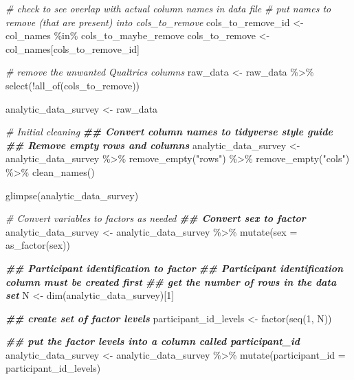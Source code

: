 \documentclass[
]{krantz}
\makeatletter
\newenvironment{Shaded}{\begin{snugshade}}{\end{snugshade}}
\newcommand{\AttributeTok}[1]{\textcolor[rgb]{0.61,0.61,0.61}{#1}}
\newcommand{\CommentTok}[1]{\textcolor[rgb]{0.37,0.37,0.37}{\textit{#1}}}
\newcommand{\DecValTok}[1]{\textcolor[rgb]{0.06,0.06,0.06}{#1}}
\newcommand{\DocumentationTok}[1]{\textcolor[rgb]{0.37,0.37,0.37}{\textbf{\textit{#1}}}}
\newcommand{\FunctionTok}[1]{\textcolor[rgb]{0,0,0}{#1}}
\newcommand{\NormalTok}[1]{#1}
\newcommand{\OtherTok}[1]{\textcolor[rgb]{0.37,0.37,0.37}{#1}}
\newcommand{\SpecialCharTok}[1]{\textcolor[rgb]{0,0,0}{#1}}
\newcommand{\StringTok}[1]{\textcolor[rgb]{0.5,0.5,0.5}{#1}}
\newenvironment{kframe}{%
\medskip{}
\setlength{\fboxsep}{.8em}
 \def\at@end@of@kframe{}%
 \ifinner\ifhmode%
  \def\at@end@of@kframe{\end{minipage}}%
  \begin{minipage}{\columnwidth}%
 \fi\fi%
 \def\FrameCommand##1{\hskip\@totalleftmargin \hskip-\fboxsep
 \colorbox{shadecolor}{##1}\hskip-\fboxsep
     \hskip-\linewidth \hskip-\@totalleftmargin \hskip\columnwidth}%
 \MakeFramed {\advance\hsize-\width
   \@totalleftmargin\z@ \linewidth\hsize
   \@setminipage}}%
 {\par\unskip\endMakeFramed%
 \at@end@of@kframe}
\renewenvironment{Shaded}{\begin{kframe}}{\end{kframe}}
\makeatother
\begin{document}
\begin{Shaded}
\begin{Highlighting}[]
\CommentTok{\# check to see overlap with actual column names in data file}
\CommentTok{\# put names to remove (that are present) into cols\_to\_remove}
\NormalTok{cols\_to\_remove\_id }\OtherTok{\textless{}{-}}\NormalTok{ col\_names }\SpecialCharTok{\%in\%}\NormalTok{ cols\_to\_maybe\_remove}
\NormalTok{cols\_to\_remove }\OtherTok{\textless{}{-}}\NormalTok{ col\_names[cols\_to\_remove\_id]}

\CommentTok{\# remove the unwanted Qualtrics columns}
\NormalTok{raw\_data }\OtherTok{\textless{}{-}}\NormalTok{ raw\_data }\SpecialCharTok{\%\textgreater{}\%} 
  \FunctionTok{select}\NormalTok{(}\SpecialCharTok{!}\FunctionTok{all\_of}\NormalTok{(cols\_to\_remove))}


\NormalTok{analytic\_data\_survey }\OtherTok{\textless{}{-}}\NormalTok{ raw\_data}

\CommentTok{\# Initial cleaning}
\DocumentationTok{\#\# Convert column names to tidyverse style guide}
\DocumentationTok{\#\# Remove empty rows and columns}
\NormalTok{analytic\_data\_survey }\OtherTok{\textless{}{-}}\NormalTok{ analytic\_data\_survey }\SpecialCharTok{\%\textgreater{}\%}
  \FunctionTok{remove\_empty}\NormalTok{(}\StringTok{"rows"}\NormalTok{) }\SpecialCharTok{\%\textgreater{}\%}
  \FunctionTok{remove\_empty}\NormalTok{(}\StringTok{"cols"}\NormalTok{) }\SpecialCharTok{\%\textgreater{}\%}
  \FunctionTok{clean\_names}\NormalTok{()}

\FunctionTok{glimpse}\NormalTok{(analytic\_data\_survey)}

\CommentTok{\# Convert variables to factors as needed}
\DocumentationTok{\#\# Convert sex to factor}
\NormalTok{analytic\_data\_survey }\OtherTok{\textless{}{-}}\NormalTok{ analytic\_data\_survey }\SpecialCharTok{\%\textgreater{}\%}
  \FunctionTok{mutate}\NormalTok{(}\AttributeTok{sex =} \FunctionTok{as\_factor}\NormalTok{(sex))}


\DocumentationTok{\#\# Participant identification to factor}
\DocumentationTok{\#\# Participant identification column must be created first}
\DocumentationTok{\#\# get the number of rows in the data set}
\NormalTok{N }\OtherTok{\textless{}{-}} \FunctionTok{dim}\NormalTok{(analytic\_data\_survey)[}\DecValTok{1}\NormalTok{] }

\DocumentationTok{\#\# create set of factor levels}
\NormalTok{participant\_id\_levels }\OtherTok{\textless{}{-}} \FunctionTok{factor}\NormalTok{(}\FunctionTok{seq}\NormalTok{(}\DecValTok{1}\NormalTok{, N))}

\DocumentationTok{\#\# put the factor levels into a column called participant\_id}
\NormalTok{analytic\_data\_survey }\OtherTok{\textless{}{-}}\NormalTok{ analytic\_data\_survey }\SpecialCharTok{\%\textgreater{}\%}
  \FunctionTok{mutate}\NormalTok{(}\AttributeTok{participant\_id =}\NormalTok{ participant\_id\_levels)}


\end{Highlighting}
\end{Shaded}
\end{document}
